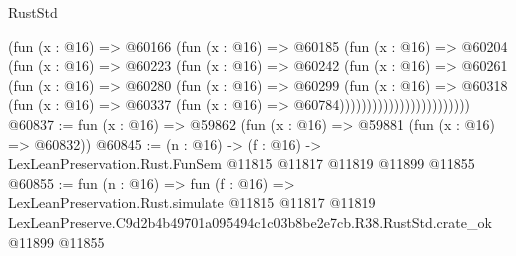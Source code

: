 \begin{lexlean}{RustStd}
\begin{coremodule}
                              (fun (x : @16) =>
                              @60166
                                (fun (x : @16) =>
                                @60185
                                  (fun (x : @16) =>
                                  @60204
                                    (fun (x : @16) =>
                                    @60223
                                      (fun (x : @16) =>
                                      @60242
                                        (fun (x : @16) =>
                                        @60261
                                          (fun (x : @16) =>
                                          @60280
                                            (fun (x : @16) =>
                                            @60299
                                              (fun (x : @16) =>
                                              @60318
                                                (fun (x : @16) =>
                                                @60337
                                                  (fun (x : @16) => @60784))))))))))))))))))))))))
@60837 := fun (x : @16) => @59862 (fun (x : @16) => @59881 (fun (x : @16) => @60832))
@60845 := (n : @16) ->
  (f : @16) -> LexLeanPreservation.Rust.FunSem @11815 @11817 @11819 @11899 @11855
@60855 := fun (n : @16) =>
  fun (f : @16) =>
  LexLeanPreservation.Rust.simulate
    @11815
    @11817
    @11819
    LexLeanPreserve.C9d2b4b49701a095494c1c03b8be2e7cb.R38.RustStd.crate_ok
    @11899
    @11855
\end{coremodule}
\end{lexlean}
